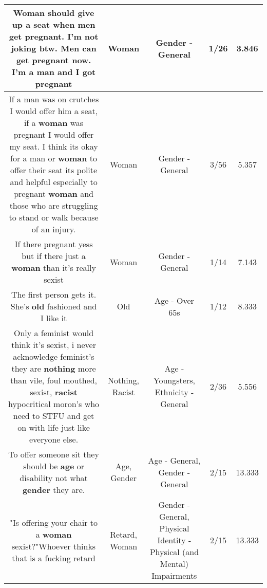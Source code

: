 \documentclass[11pt]{article}
\newlength\mylength
\begin{document}
\begin{center}
\begin{longtable}{|C{.65\mylength}|C{.30\mylength}|C{.12\mylength}|C{.12\mylength}|C{.12\mylength}|}
  \small Woman should give up a seat when men get pregnant. I'm not joking btw. Men can get pregnant now. I'm a man and I got pregnant\normalsize   & Woman & Gender - General & 1/26 & 3.846 \\  \hline
  \small If a man was on crutches I would offer him a seat, if a \textbf{woman} was pregnant I would offer my seat. I think its okay for a man or \textbf{woman} to offer their seat its polite and helpful especially to pregnant \textbf{woman} and those who are struggling to stand or walk because of an injury.\normalsize   & Woman & Gender - General & 3/56 & 5.357 \\  \hline
  \small If there pregnant yess but if there just a \textbf{woman} than it's really sexist\normalsize   & Woman & Gender - General & 1/14 & 7.143 \\  \hline
  \small The first person gets it. She's \textbf{old} fashioned and I like it\normalsize   & Old & Age - Over 65s & 1/12 & 8.333 \\  \hline
  \small Only a feminist would think it's sexist, i never acknowledge feminist's they are \textbf{nothing} more than vile, foul mouthed, sexist, \textbf{racist} hypocritical moron's who need to STFU and get on with life just like everyone else.\normalsize   & Nothing, Racist & Age - Youngsters, Ethnicity - General & 2/36 & 5.556 \\  \hline
  \small To offer someone sit they should be \textbf{age} or disability not what \textbf{gender} they are.\normalsize   & Age, Gender & Age - General, Gender - General & 2/15 & 13.333 \\  \hline
  \small "Is offering your chair to a \textbf{woman} sexist?"Whoever thinks that is a fucking retard\normalsize   & Retard, Woman & Gender - General, Physical Identity - Physical (and Mental) Impairments & 2/15 & 13.333 \\  \hline

\end{longtable}
\end{center}
\end{document}
